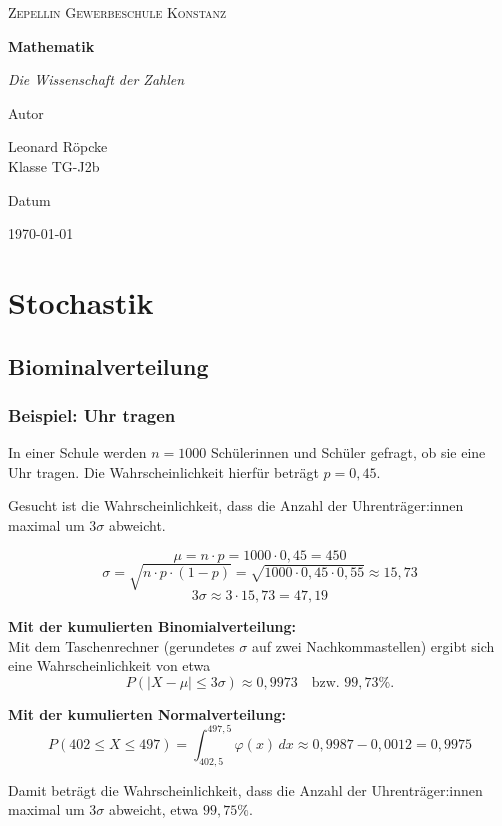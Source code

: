 \documentclass{article}
\newcommand{\AuthorName}{Leonard Röpcke\\Klasse TG-J2b}
\newcommand{\Institute}{Zepellin Gewerbeschule Konstanz}
\newcommand{\Subtitle}{Die Wissenschaft der Zahlen}
\newcommand{\MyDate}{\today}
\begin{document}
\begin{titlepage}
  \centering
  {\scshape\LARGE \Institute \par}
  \vspace{2.5cm}
  {\huge\bfseries Mathematik\par}
  \vspace{0.8cm}
  {\Large\itshape \Subtitle \par}
  \vfill
  {\Large Autor\par}
  {\Large \AuthorName \par}
  \vspace{1cm}
  {\Large Datum\par}
  {\Large \MyDate \par}
  \vfill
  \vspace{1cm}
  {\small }
\end{titlepage}
\tableofcontents
\newpage

\section{Stochastik}
\subsection{Biominalverteilung}
\subsubsection{Beispiel: Uhr tragen}
In einer Schule werden \( n = 1000 \) Schülerinnen und Schüler gefragt, ob sie eine Uhr tragen.  
Die Wahrscheinlichkeit hierfür beträgt \( p = 0{,}45 \).

Gesucht ist die Wahrscheinlichkeit, dass die Anzahl der Uhrenträger:innen maximal um \( 3\sigma \) abweicht.

\[
\mu = n \cdot p = 1000 \cdot 0{,}45 = 450
\]
\[
\sigma = \sqrt{n \cdot p \cdot (1 - p)} = \sqrt{1000 \cdot 0{,}45 \cdot 0{,}55} \approx 15{,}73
\]
\[
3\sigma \approx 3 \cdot 15{,}73 = 47{,}19
\]

\noindent
\textbf{Mit der kumulierten Binomialverteilung:}\\
Mit dem Taschenrechner (gerundetes \(\sigma\) auf zwei Nachkommastellen) ergibt sich eine Wahrscheinlichkeit von etwa
\[
P(|X - \mu| \leq 3\sigma) \approx 0{,}9973 \quad \text{bzw. } 99{,}73\%.
\]

\medskip
\textbf{Mit der kumulierten Normalverteilung:}
\[
P(402 \leq X \leq 497)
= \int_{402{,}5}^{497{,}5} \varphi(x) \, dx
\approx 0{,}9987 - 0{,}0012 = 0{,}9975
\]

Damit beträgt die Wahrscheinlichkeit, dass die Anzahl der Uhrenträger:innen maximal um \( 3\sigma \) abweicht, etwa \( 99{,}75\% \).
\end{document}
